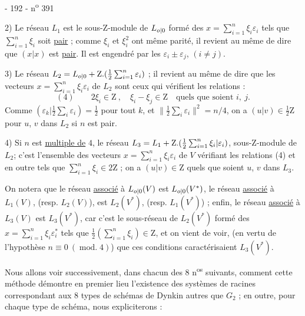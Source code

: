 - 192 - \hfill n\textsuperscript{o} 391

2) Le réseau $L_1$ est le sous-$\mathrm Z$-module de $L_{\relax{o|0}}$ formé des $x=\sum_{i=1}^n\xi_i\varepsilon_i$ tels que $\sum_{i=1}^n\xi_i$ soit \uline{pair} ; comme $\xi_i$ et $\xi_i^2$ ont même parité, il revient au même de dire que $(x|x)$ est \uline{pair}. Il est engendré par les $\varepsilon_i\pm\varepsilon_j$, $(i\neq j)$.

3) Le réseau $L_2=L_{\relax{o|0}}+\mathrm Z.(\frac12\sum_{i=1}^n\varepsilon_i)$ ; il revient au même de dire que les vecteurs $x=\sum_{i=1}^n\xi_i\varepsilon_i$ de $L_2$ sont ceux qui vérifient les relations :
\[
(4)\qquad 2\xi_i\in\mathrm Z\ ,\quad\xi_i-\xi_j\in\mathrm Z\quad\text{quels que soient }i,\ j.
\]
Comme $(\varepsilon_k|\frac12\sum_i\varepsilon_i)=\frac12$ pour tout $k$, et $\|\frac12\sum_i\varepsilon_i\|^2=n/4$, on a $(u|v)\in\frac12\mathrm Z$ pour $u$, $v$ dans $L_2$ si $n$ est pair.

4) Si $n$ est \uline{multiple de} $4$, le réseau $L_3=L_1+\mathrm Z.(\frac12\sum_{i=1}^n\relax{\xi_i|\varepsilon_i})$, sous-$\mathrm Z$-module de $L_2$; c'est l'ensemble des vecteurs $x=\sum_{i=1}^n\xi_i\varepsilon_i$ de $V$ vérifiant les relations (4) et en outre tels que $\sum_{i=1}^n\xi_i\in2\mathrm Z$ ; on a $(u|v)\in\mathrm Z$ quels que soient $u$, $v$ dans $L_3$.

On notera que le réseau \uline{associé} à $L_{\relax{o|0}}(V)$ est $L_{\relax{o|0}}(V^*)$, le réseau \uline{associé} à $L_1(V)$, (resp. $L_2(V)$), est $L_2(V^*)$, (resp. $L_1(V^*)$) ; enfin, le réseau \uline{associé} à $L_3(V)$ est $L_3(V^*)$, car c'est le sous-réseau de $L_2(V^*)$ formé des $x=\sum_{i=1}^n\xi_i\varepsilon_i^*$ tels que $\frac12(\sum_{i=1}^n\xi_i)\in\mathrm Z$, et on vient de voir, (en vertu de l'hypothèse $n\equiv0\ (\operatorname{mod.}4)$) que ces conditions caractérisaient $L_3(V^*)$.

Nous allons voir successivement, dans chacun des 8 n\textsuperscript{os} suivants, comment cette méthode démontre en premier lieu l'existence des systèmes de racines correspondant aux 8 types de schémas de Dynkin autres que $G_2$ ; en outre, pour chaque type de schéma, nous expliciterons :
